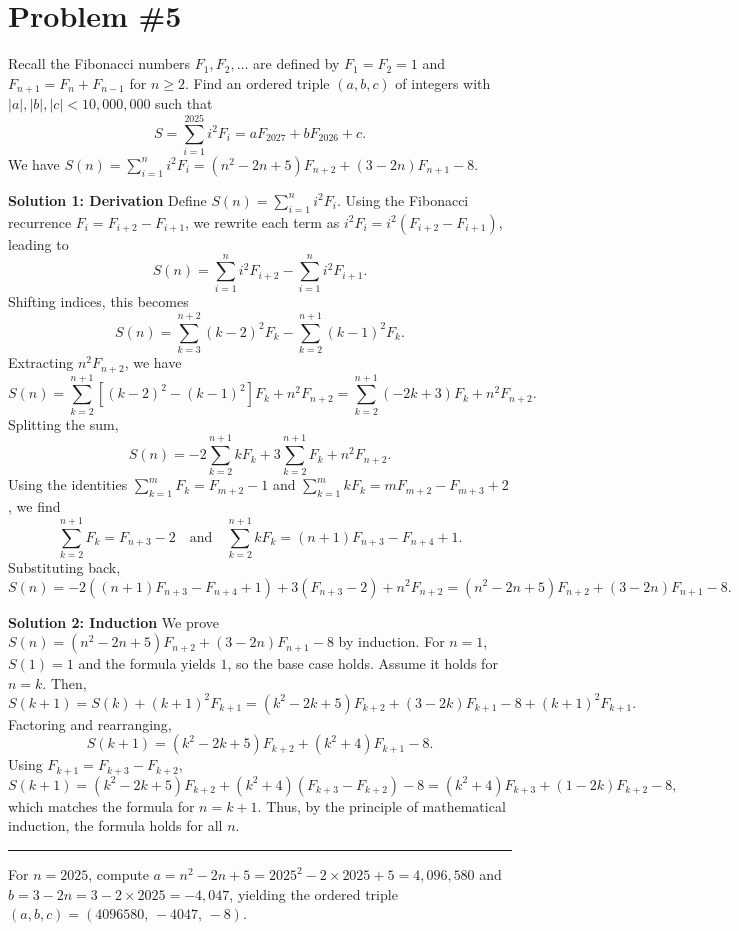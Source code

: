 \documentclass[10pt]{article}
\theoremstyle{plain}
\theoremstyle{definition}
\theoremstyle{remark}
\begin{document}
\section{Problem \#5}

Recall the Fibonacci numbers \(F_1,F_2,\ldots\) are defined by \(F_1=F_2=1\) and \(F_{n+1}=F_n+F_{n-1}\) for \(n\geqslant 2\). Find an ordered triple \((a,b,c)\) of integers with \(|a|,|b|,|c|<10{,}000{,}000\) such that 
\[
S = \sum_{i=1}^{2025} i^2 F_i = aF_{2027} + bF_{2026} + c.
\]
We have \(S(n) = \sum_{i=1}^{n} i^2 F_i = (n^2 - 2n + 5)F_{n+2} + (3 - 2n)F_{n+1} - 8\). 

\textbf{Solution 1: Derivation} Define \(S(n) = \sum_{i=1}^{n} i^2 F_i\). Using the Fibonacci recurrence \(F_i = F_{i+2} - F_{i+1}\), we rewrite each term as \(i^2 F_i = i^2(F_{i+2} - F_{i+1})\), leading to
\[
S(n) = \sum_{i=1}^{n} i^2 F_{i+2} - \sum_{i=1}^{n} i^2 F_{i+1}.
\]
Shifting indices, this becomes 
\[
S(n) = \sum_{k=3}^{n+2} (k-2)^2 F_k - \sum_{k=2}^{n+1} (k-1)^2 F_k.
\]
Extracting \(n^2F_{n+2}\), we have 
\[
S(n) = \sum_{k=2}^{n+1} \left[(k-2)^2 - (k-1)^2\right] F_k + n^2 F_{n+2} = \sum_{k=2}^{n+1} (-2k + 3) F_k + n^2 F_{n+2}.
\]
Splitting the sum, 
\[
S(n) = -2 \sum_{k=2}^{n+1} k F_k + 3 \sum_{k=2}^{n+1} F_k + n^2 F_{n+2}.
\]
Using the identities \(\sum_{k=1}^{m} F_k = F_{m+2} - 1\) and \(\sum_{k=1}^{m} k F_k = m F_{m+2} - F_{m+3} + 2\), we find
\[
\sum_{k=2}^{n+1} F_k = F_{n+3} - 2 \quad \text{and} \quad \sum_{k=2}^{n+1} k F_k = (n+1)F_{n+3} - F_{n+4} + 1.
\]
Substituting back, 
\[
S(n) = -2\left((n+1)F_{n+3} - F_{n+4} + 1\right) + 3(F_{n+3} - 2) + n^2 F_{n+2} = (n^2 - 2n + 5)F_{n+2} + (3 - 2n)F_{n+1} - 8.
\]

\textbf{Solution 2: Induction} We prove \(S(n) = (n^2 - 2n + 5)F_{n+2} + (3 - 2n)F_{n+1} - 8\) by induction. For \(n=1\), \(S(1)=1\) and the formula yields \(1\), so the base case holds. Assume it holds for \(n=k\). Then,
\[
S(k+1) = S(k) + (k+1)^2 F_{k+1} = (k^2 - 2k + 5)F_{k+2} + (3 - 2k)F_{k+1} - 8 + (k+1)^2 F_{k+1}.
\]
Factoring and rearranging,
\[
S(k+1) = (k^2 - 2k + 5)F_{k+2} + (k^2 + 4)F_{k+1} - 8.
\]
Using \(F_{k+1} = F_{k+3} - F_{k+2}\),
\[
S(k+1) = (k^2 - 2k + 5)F_{k+2} + (k^2 + 4)(F_{k+3} - F_{k+2}) - 8 = (k^2 + 4)F_{k+3} + (1 - 2k)F_{k+2} - 8,
\]
which matches the formula for \(n=k+1\). Thus, by the principle of mathematical induction, the formula holds for all \(n\).

\noindent\rule{16cm}{0.4pt}

For \(n = 2025\), compute \(a = n^2-2n+5=2025^2 - 2 \times 2025 + 5 = 4{,}096{,}580\) and \(b = 3-2n=3 - 2 \times 2025 = -4{,}047\), yielding the ordered triple \(\boxed{(a,b,c)=(4096580,\,-4047,\,-8)}\).
\end{document}
